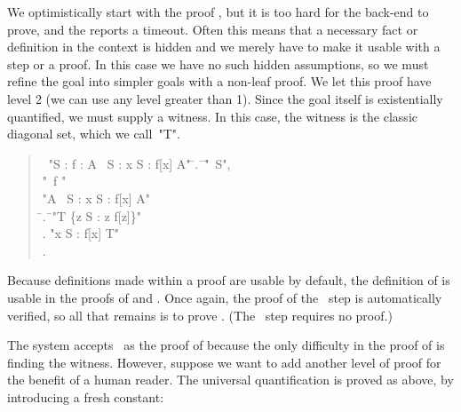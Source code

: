\documentclass[a4paper]{easychair}
\begin{document}
We optimistically start with the proof \OBVIOUS, but it is too hard
for the back-end to prove, and the \PM reports a timeout.  Often this
means that a necessary fact or definition in the context is hidden and
we merely have to make it usable with a \USE step or a \BY proof.  In
this case we have no such hidden assumptions, so we must refine the
goal into simpler goals with a non-leaf proof.  We let this proof have
level 2 (we can use any level greater than 1).  Since the goal itself
is existentially quantified, we must supply a witness.  In this case,
the witness is the classic diagonal set, which we call~"T".
\begin{quote} \small
  \begin{tabbing}
    \THEOREM\ "\forall S : \forall f \in [S -> \SUBSET\ S] : \exists A \in \SUBSET\ S : \forall x \in S : f[x] \neq A" \kill
    \PROOF \kill
    \LSP \= .\ \= \ASSUME \= "\NEW\ S", \\
         \>        \>         \> "\NEW\ f \in [S -> \SUBSET\ S]" \\
         \>        \> \PROVE "\exists A \in \SUBSET\ S : \forall x \in S : f[x] \neq A" \\
         \>   \hspace{1em}     \= .\ \= \DEFINE "T \DEF \{z \in S : z \notin f[z]\}" \\
         \>        \> .  \> "\forall x \in S : f[x] \neq T" \\
         \>        \> .  \> \QED \BY {}
  \end{tabbing}
\end{quote}
Because definitions made within a proof are usable by default, the
definition of  is usable in the proofs of  and .  Once
again, the proof of the \QED\ step is automatically verified, so all
that remains is to prove .  (The \DEFINE\ step requires no proof.)

The system accepts \OBVIOUS\ as the proof of  because the only
difficulty in the proof of  is finding the witness. However,
suppose we want to add another level of proof for the benefit of a
human reader.  The universal quantification is proved as above, by
introducing a fresh constant:
\end{document}
